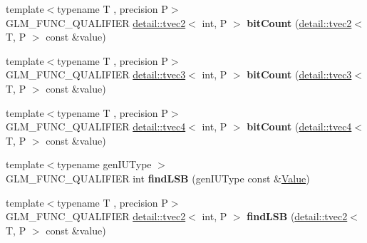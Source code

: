 \begin{DoxyCompactItemize}
\item 
{\footnotesize template$<$typename T , precision P$>$ }\\G\+L\+M\+\_\+\+F\+U\+N\+C\+\_\+\+Q\+U\+A\+L\+I\+F\+I\+ER \hyperlink{structglm_1_1detail_1_1tvec2}{detail\+::tvec2}$<$ int, P $>$ {\bfseries bit\+Count} (\hyperlink{structglm_1_1detail_1_1tvec2}{detail\+::tvec2}$<$ T, P $>$ const \&value)\hypertarget{namespaceglm_a573d6ea294a27e158525a1558eac5492}{}\label{namespaceglm_a573d6ea294a27e158525a1558eac5492}

\item 
{\footnotesize template$<$typename T , precision P$>$ }\\G\+L\+M\+\_\+\+F\+U\+N\+C\+\_\+\+Q\+U\+A\+L\+I\+F\+I\+ER \hyperlink{structglm_1_1detail_1_1tvec3}{detail\+::tvec3}$<$ int, P $>$ {\bfseries bit\+Count} (\hyperlink{structglm_1_1detail_1_1tvec3}{detail\+::tvec3}$<$ T, P $>$ const \&value)\hypertarget{namespaceglm_a2f5b97b2cca4741488209eac160ef903}{}\label{namespaceglm_a2f5b97b2cca4741488209eac160ef903}

\item 
{\footnotesize template$<$typename T , precision P$>$ }\\G\+L\+M\+\_\+\+F\+U\+N\+C\+\_\+\+Q\+U\+A\+L\+I\+F\+I\+ER \hyperlink{structglm_1_1detail_1_1tvec4}{detail\+::tvec4}$<$ int, P $>$ {\bfseries bit\+Count} (\hyperlink{structglm_1_1detail_1_1tvec4}{detail\+::tvec4}$<$ T, P $>$ const \&value)\hypertarget{namespaceglm_a8c668fc78e5881f3ae8b93a997ce8d22}{}\label{namespaceglm_a8c668fc78e5881f3ae8b93a997ce8d22}

\item 
{\footnotesize template$<$typename gen\+I\+U\+Type $>$ }\\G\+L\+M\+\_\+\+F\+U\+N\+C\+\_\+\+Q\+U\+A\+L\+I\+F\+I\+ER int {\bfseries find\+L\+SB} (gen\+I\+U\+Type const \&\hyperlink{document_8h_a071cf97155ba72ac9a1fc4ad7e63d481}{Value})\hypertarget{namespaceglm_a984d0192bd95085d8efb0a1a00a4e6d9}{}\label{namespaceglm_a984d0192bd95085d8efb0a1a00a4e6d9}

\item 
{\footnotesize template$<$typename T , precision P$>$ }\\G\+L\+M\+\_\+\+F\+U\+N\+C\+\_\+\+Q\+U\+A\+L\+I\+F\+I\+ER \hyperlink{structglm_1_1detail_1_1tvec2}{detail\+::tvec2}$<$ int, P $>$ {\bfseries find\+L\+SB} (\hyperlink{structglm_1_1detail_1_1tvec2}{detail\+::tvec2}$<$ T, P $>$ const \&value)\hypertarget{namespaceglm_ae037356ab3b0ac098723dfe091a93753}{}\label{namespaceglm_ae037356ab3b0ac098723dfe091a93753}


\end{DoxyCompactItemize}
